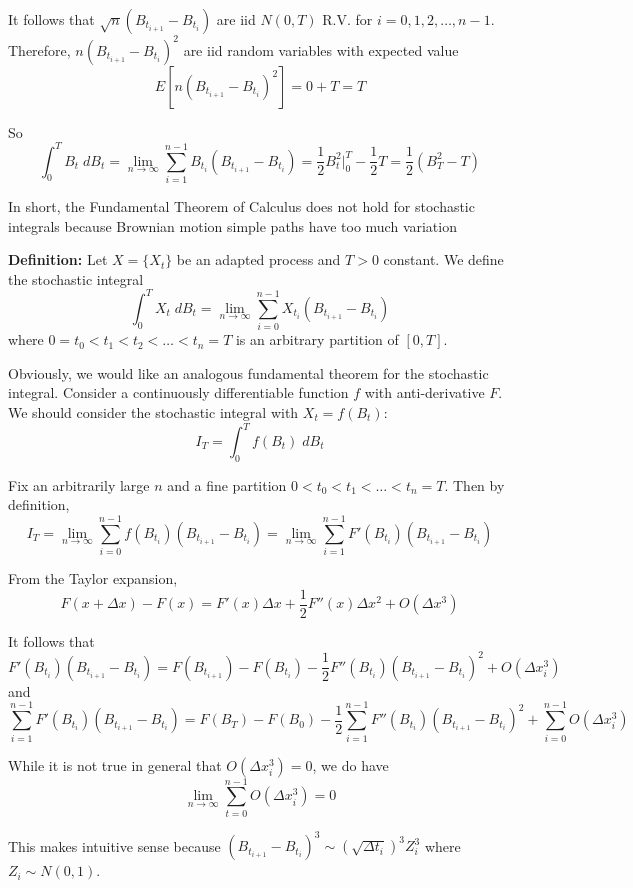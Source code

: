 \documentclass[12pt]{report}
\newcommand*{\tbf}[1]{\ifmmode\mathbf{#1}\else\textbf{#1}\fi}
\begin{document}
\begin{itemize}
        It follows that $\sqrt{n}(B_{t_{i+1}}- B_{t_i})$ are iid $N(0, T)$ R.V. for $i =0, 1, 2, \dots, n -1$. Therefore, $n(B_{t_{i+1}} - B_{t_i})^2$ are iid random variables with expected value 
        \[E[n(B_{t_{i+1}} - B_{t_i})^2] = 0 + T = T\]

        So 
        \[\int_0^T B_t \; d B_t = \lim_{n \to \infty} \sum_{i=1}^{n-1} B_{t_i}(B_{t_{i+1}} - B_{t_i}) = \frac{1}{2}B_t^2 \bigg\vert_0^T - \frac{1}{2} T = \frac{1}{2}(B_T^2 - T)\]

        In short, the Fundamental Theorem of Calculus does not hold for stochastic integrals because Brownian motion simple paths have too much variation
    
    \end{itemize}

    
    \tbf{Definition:} Let $X = \{X_t\}$ be an adapted process and $T>0$ constant. We define the stochastic integral
    \[\int_0^T X_t \; dB_t = \lim_{n \to \infty} \sum_{i=0}^{n-1} X_{t_i} (B_{t_{i+1}} - B_{t_i})\]
    where $0 = t_0 < t_1 < t_2 < \dots < t_n = T$ is an arbitrary partition of $[0, T]$. 

    Obviously, we would like an analogous fundamental theorem for the stochastic integral. Consider a continuously differentiable function $f$ with anti-derivative $F$. We should consider the stochastic integral with $X_t = f(B_t)$:
    \[I_T = \int_0^T f(B_t)\; dB_t\]

    Fix an arbitrarily large $n$ and a fine partition $0 < t_0 < t_1 < \dots < t_n = T$. Then by definition, 
    \[I_T = \lim_{n \to \infty} \sum_{i=0}^{n-1} f(B_{t_i}) (B_{t_{i+1}} - B_{t_i}) = \lim_{n \to \infty} \sum_{i=1}^{n-1} F'(B_{t_i})(B_{t_{i+1}} - B_{t_i}) \]

    From the Taylor expansion, 
    \[F(x + \Delta x) - F(x) = F'(x) \Delta x + \frac{1}{2} F''(x) \Delta x^2 + O(\Delta x^3)\]

    It follows that 
    \[F'(B_{t_i})(B_{t_{i+1}} - B_{t_i}) = F(B_{t_{i+1}}) - F(B_{t_i}) - \frac{1}{2}F''(B_{t_i})(B_{t_{i+1}} - B_{t_i})^2 + O(\Delta x_i^3)\]
    and 
    \[\sum_{i=1}^{n-1} F'(B_{t_i})(B_{t_{i+1}} - B_{t_i}) = F(B_T) - F(B_0) - \frac{1}{2}\sum_{i=1}^{n-1} F''(B_{t_i})(B_{t_{i+1}} - B_{t_i})^2 + \sum_{i=0}^{n -1} O(\Delta x_i^3)\]

    While it is not true in general that $O(\Delta x_i^3) = 0$, we do have 
    \[\lim_{n \to \infty} \sum_{t=0}^{n-1} O(\Delta x_i^3) = 0\]

    This makes intuitive sense because $(B_{t_{i+1}} - B_{t_i})^3 \sim (\sqrt{\Delta t_i})^3 Z_i^3$ where $Z_i \sim N(0, 1)$. 
\end{document}
